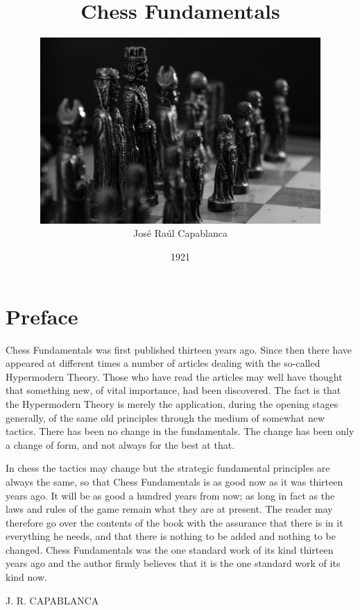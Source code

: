 \documentclass[11pt,a4paper]{book}
\begin{document}
\title{Chess Fundamentals}
\author{\includegraphics[width=0.8\textwidth]{Image/Ttl_Img.JPG}
\\
José Raúl Capablanca}
\date{1921}
\maketitle

\chapter*{Preface}

Chess Fundamentals was first published thirteen years ago. Since then there have appeared at different times a number of articles dealing with the so-called Hypermodern Theory. Those who have read the articles may well have thought that something new, of vital importance, had been discovered. The fact is that the Hypermodern Theory is merely the application, during the opening stages generally, of the same old principles through the medium of somewhat new tactics. There has been no change in the fundamentals. The change has been only a change of form, and not always for the best at that.

In chess the tactics may change but the strategic fundamental principles are always the same, so that Chess Fundamentals is as good now as it was thirteen years ago. It will be as good a hundred years from now; as long in fact as the laws and rules of the game remain what they are at present. The reader may therefore go over the contents of the book with the assurance that there is in it everything he needs, and that there is nothing to be added and nothing to be changed. Chess Fundamentals was the one standard work of its kind thirteen years ago and the author firmly believes that it is the one standard work of its kind now.

J. R. CAPABLANCA
\end{document}
